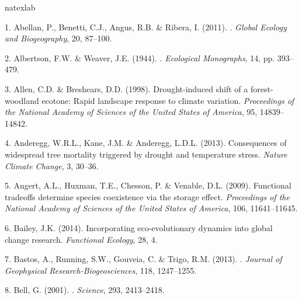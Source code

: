 \documentclass[11pt,a4paper,oneside]{article}
\begin{document}
\newpage
\begin{thebibliography}{79}
\expandafter\ifx\csname natexlab\endcsname\relax\def\natexlab#1{#1}\fi

1. Abellan, P., Benetti, C.J., Angus, R.B. \& Ribera, I. (2011).
.
\newblock \emph{Global Ecology and Biogeography}, 20, 87--100.

2. Albertson, F.W. \& Weaver, J.E. (1944).
.
\newblock \emph{Ecological Monographs}, 14, pp. 393--479.

3. Allen, C.D. \& Breshears, D.D. (1998).
\newblock Drought-induced shift of a forest-woodland ecotone: Rapid landscape
  response to climate variation.
\newblock \emph{Proceedings of the National Academy of Sciences of the United
  States of America}, 95, 14839--14842.

4. Anderegg, W.R.L., Kane, J.M. \& Anderegg, L.D.L. (2013).
\newblock Consequences of widespread tree mortality triggered by drought and
  temperature stress.
\newblock \emph{Nature Climate Change}, 3, 30--36.

5. Angert, A.L., Huxman, T.E., Chesson, P. \& Venable, D.L. (2009).
\newblock Functional tradeoffs determine species coexistence via the storage
  effect.
\newblock \emph{Proceedings of the National Academy of Sciences of the United
  States of America}, 106, 11641--11645.

6. Bailey, J.K. (2014).
\newblock Incorporating eco-evolutionary dynamics into global change research.
\newblock \emph{Functional Ecology}, 28, 4.

7. Bastos, A., Running, S.W., Gouveia, C. \& Trigo, R.M. (2013).
.
\newblock \emph{Journal of Geophysical Research-Biogeosciences}, 118,
  1247--1255.

8. Bell, G. ({2001}).
.
\newblock \emph{Science}, {293}, {2413--2418}.


\end{thebibliography}
\end{document}
